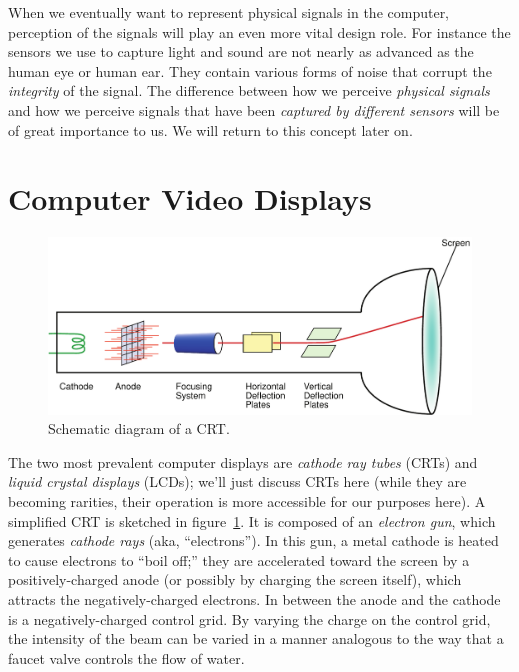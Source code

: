 When we eventually want to represent physical signals in the computer,
perception of the signals will play an even more vital design
role. For instance the sensors we use to capture light and sound are
not nearly as advanced as the human eye or human ear. They contain
various forms of noise that corrupt the \emph{integrity} of the
signal. The difference between how we perceive \emph{physical signals}
and how we perceive signals that have been \emph{captured by different
  sensors} will be of great importance to us. We will return to this
concept later on.

\section{Computer Video Displays}

\begin{figure}
\centerline{\includegraphics[width=\textwidth]{ch-physical/crt}}
\caption{Schematic diagram of a CRT.\label{fg:crt}}
\end{figure}

The two most prevalent computer displays are \emph{cathode ray tubes}
(CRTs) and \emph{liquid crystal displays} (LCDs); we'll just discuss
CRTs here (while they are becoming rarities, their operation is more
accessible for our purposes here). A simplified CRT is sketched in
figure~\ref{fg:crt}. It is
composed of an \emph{electron gun}, which generates \emph{cathode
rays} (aka, ``electrons''). In this gun, a metal cathode is heated to
cause electrons to ``boil off;'' they are accelerated toward the
screen by a positively-charged anode (or possibly by charging the
screen itself), which attracts the negatively-charged electrons. In
between the anode and the cathode is a negatively-charged control
grid. By varying the charge on the control grid, the intensity of the
beam can be varied in a manner analogous to the way that a faucet
valve controls the flow of water.

